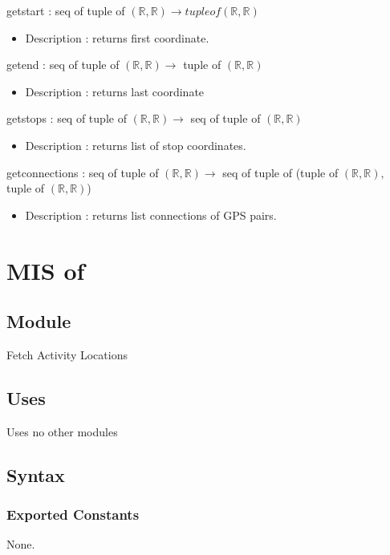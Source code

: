 \documentclass[12pt, titlepage]{article}
\begin{document}
getstart : seq of tuple of $(\mathbb{R}, \mathbb{R})  \rightarrow tuple of (\mathbb{R}, \mathbb{R})$
\begin{itemize}
    \item Description : returns first coordinate.
\end{itemize}
getend : seq of tuple of $(\mathbb{R}, \mathbb{R})  \rightarrow$ tuple of $(\mathbb{R}, \mathbb{R})$
\begin{itemize}
    \item Description : returns last coordinate
\end{itemize}
getstops : seq of tuple of $(\mathbb{R}, \mathbb{R})  \rightarrow$ seq of tuple of $(\mathbb{R}, \mathbb{R})$
\begin{itemize}
    \item Description : returns list of stop coordinates.
\end{itemize}
getconnections : seq of tuple of $(\mathbb{R}, \mathbb{R})  \rightarrow$ seq of tuple of (tuple of $(\mathbb{R}, \mathbb{R}),$ tuple of $(\mathbb{R}, \mathbb{R})$)
\begin{itemize}
    \item Description : returns list connections of GPS pairs.
\end{itemize}
\newpage


\section{MIS of } \label{ModuleSPath} 

\subsection{Module}
Fetch Activity Locations

\subsection{Uses}%
Uses no other modules

\subsection{Syntax}

\subsubsection{Exported Constants}
None.
\end{document}

